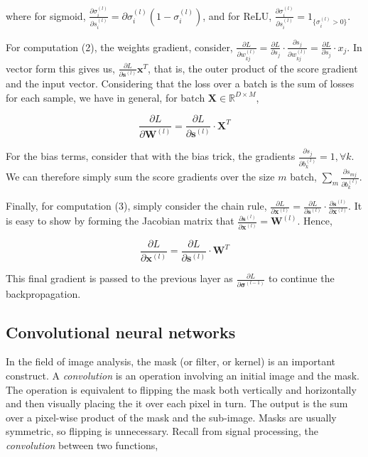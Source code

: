 where for sigmoid, $\frac{\partial\sigma_i^{(l)}}{\partial{s}_i^{(l)}} = \partial\sigma_i^{(l)}(1 - \sigma_i^{(l)})$, and for ReLU, $\frac{\partial\sigma_i^{(l)}}{\partial{s}_i^{(l)}} = 1_{\{\sigma_i^{(l)} > 0\}}$.

For computation (2), the weights gradient, consider, $\frac{\partial L}{\partial w_{kj}^{(l)}} = \frac{\partial L}{\partial s_j}\cdot\frac{\partial s_j}{\partial w_{kj}^{(l)}} = \frac{\partial L}{\partial s_j}\cdot x_j$. In vector form this gives us, $\frac{\partial L}{\partial \mathbf{s}^{(l)}}\mathbf{x}^T$, that is, the outer product of the score gradient and the input vector. Considering that the loss over a batch is the sum of losses for each sample, we have in general, for batch $\mathbf{X} \in \mathbb{R}^{D \times M}$,

$$\frac{\partial L}{\partial \mathbf{W}^{(l)}} = \frac{\partial L}{\partial \mathbf{s}^{(l)}}\cdot\mathbf{X}^T$$

For the bias terms, consider that with the bias trick, the gradients $\frac{\partial s_j}{\partial b_{k}^{(l)}} = 1, \forall k$. We can therefore simply sum the score gradients over the size $m$ batch, $\sum_m\frac{\partial s_{mj}}{\partial b_{k}^{(l)}}$. 

Finally, for computation (3), simply consider the chain rule, $\frac{\partial L}{\partial\mathbf{x}^{(l)}} = \frac{\partial L}{\partial\mathbf{s}^{(l)}}\cdot\frac{\partial\mathbf{s}^{(l)}}{\partial\mathbf{x}^{(l)}}.$ It is easy to show by forming the Jacobian matrix that $\frac{\partial\mathbf{s}^{(l)}}{\partial\mathbf{x}^{(l)}} = \mathbf{W}^{(l)}$. Hence,

$$\frac{\partial L}{\partial \mathbf{x}^{(l)}} = \frac{\partial L}{\partial \mathbf{s}^{(l)}}\cdot\mathbf{W}^T$$

This final gradient is passed to the previous layer as $\frac{\partial L}{\partial \boldsymbol{\sigma}^{(l-1)}}$ to continue the backpropagation.

\subsection{Convolutional neural networks}

In the field of image analysis, the mask (or filter, or kernel) is an important construct. A \emph{convolution} is an operation involving an initial image and the mask. The operation is equivalent to flipping the mask both vertically and horizontally and then visually placing the it over each pixel in turn. The output is the sum over a pixel-wise product of the mask and the sub-image. Masks are usually symmetric, so flipping is unnecessary. Recall from signal processing, the \emph{convolution} between two functions,

